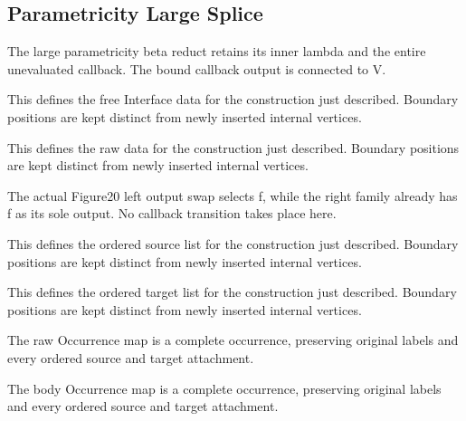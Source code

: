 \subsection{Parametricity Large Splice}
The large parametricity beta reduct retains its inner lambda and the entire unevaluated callback. The bound callback output is connected to V.

This defines the free Interface data for the construction just described. Boundary positions are kept distinct from newly inserted internal vertices.
\par{}

This defines the raw data for the construction just described. Boundary positions are kept distinct from newly inserted internal vertices.
\par{}

The actual Figure20 left output swap selects f, while the right family already has f as its sole output. No callback transition takes place here.
\par{}

This defines the ordered source list for the construction just described. Boundary positions are kept distinct from newly inserted internal vertices.
\par{}

This defines the ordered target list for the construction just described. Boundary positions are kept distinct from newly inserted internal vertices.
\par{}

The raw Occurrence map is a complete occurrence, preserving original labels and every ordered source and target attachment.
\par{}

The body Occurrence map is a complete occurrence, preserving original labels and every ordered source and target attachment.
\par{}

